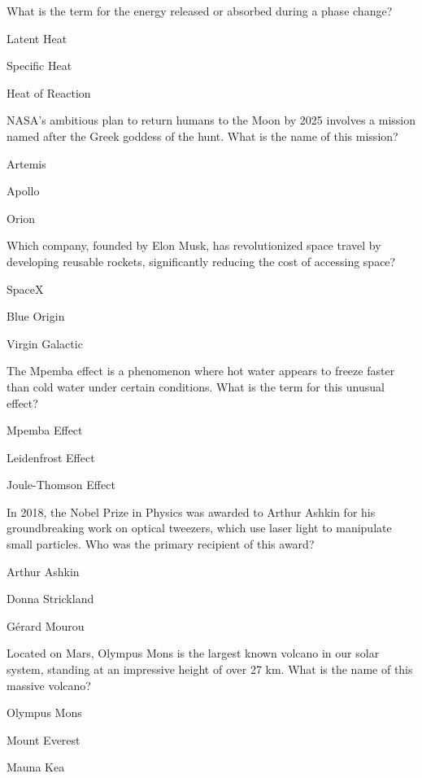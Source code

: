 \begin{enhancedmcq}{What is the term for the energy released or absorbed during a phase change?}
\item Latent Heat
\item Specific Heat
\item Heat of Reaction

\end{enhancedmcq}
\begin{enhancedmcq}{NASA's ambitious plan to return humans to the Moon by 2025 involves a mission named after the Greek goddess of the hunt. What is the name of this mission?}
\item Artemis
\item Apollo
\item Orion

\end{enhancedmcq}
\begin{enhancedmcq}{Which company, founded by Elon Musk, has revolutionized space travel by developing reusable rockets, significantly reducing the cost of accessing space?}
\item SpaceX
\item Blue Origin
\item Virgin Galactic

\end{enhancedmcq}
\begin{enhancedmcq}{The Mpemba effect is a phenomenon where hot water appears to freeze faster than cold water under certain conditions. What is the term for this unusual effect?}
\item Mpemba Effect
\item Leidenfrost Effect
\item Joule-Thomson Effect

\end{enhancedmcq}
\begin{enhancedmcq}{In 2018, the Nobel Prize in Physics was awarded to Arthur Ashkin for his groundbreaking work on optical tweezers, which use laser light to manipulate small particles. Who was the primary recipient of this award?}
\item Arthur Ashkin
\item Donna Strickland
\item Gérard Mourou

\end{enhancedmcq}
\begin{enhancedmcq}{Located on Mars, Olympus Mons is the largest known volcano in our solar system, standing at an impressive height of over 27 km. What is the name of this massive volcano?}
\item Olympus Mons
\item Mount Everest
\item Mauna Kea

\end{enhancedmcq}
